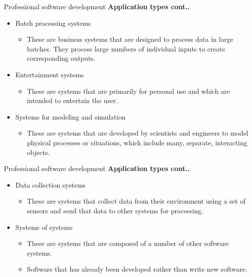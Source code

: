 \documentclass{beamer}
\begin{document}
\begin{frame}{{Professional software development}}
	\textbf{Application types cont..}
	\begin{itemize}
		\item Batch processing systems
		\begin{itemize}
			\item These are business systems that are designed to process data in large batches. 
			They process large numbers of individual inputs to create corresponding 
			outputs. 
		\end{itemize}
		\item Entertainment systems 
		\begin{itemize}
			\item These are systems that are primarily for personal use and which are intended to entertain the user. 
		\end{itemize}
		\item Systems for modeling and simulation
		\begin{itemize}
			\item These are systems that are developed by scientists and engineers to model 
			physical processes or situations, which include many, separate, interacting 
			objects.
		\end{itemize}
	\end{itemize}
\end{frame}

\begin{frame}{{Professional software development}}
	\textbf{Application types cont..}
	\begin{itemize}
		\item Data collection systems
		\begin{itemize}
			\item These are systems that collect data from their environment using a set of sensors and send that data to other systems for processing.
		\end{itemize}
		\item Systems of systems 
		\begin{itemize}
			\item  These are systems that are composed of a number of other software systems.
			\item Software that has already been developed rather than write new software.

		\end{itemize}
	\end{itemize}
\end{frame}
\end{document}

